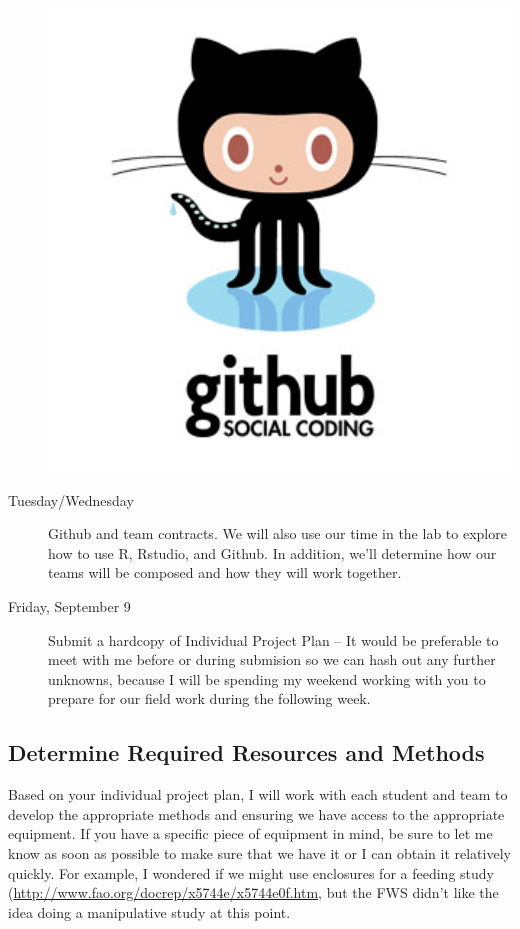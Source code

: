 \documentclass{tufte-handout}\usepackage[]{graphicx}\usepackage[]{color}
\begin{document}
\begin{description}
\begin{marginfigure}
   \includegraphics[width=1.0\textwidth]{github_logo.jpg}
\end{marginfigure}

\item[Tuesday/Wednesday] Github and team contracts. We will also use our time in the lab to explore how to use R, Rstudio, and Github. In addition, we'll determine how our teams will be composed and how they will work together.

\item[Friday, September 9] Submit a hardcopy of Individual Project Plan -- It would be preferable to meet with me before or during submision so we can hash out any further unknowns, because I will be spending my weekend working with you to prepare for our field work during the following week.
\end{description}

\subsection{Determine Required Resources and Methods}

Based on your individual project plan, I will work with each student and team to develop the appropriate methods and ensuring we have access to the appropriate equipment. If you have a specific piece of equipment in mind, be sure to let me know as soon as possible to make sure that we have it or I can obtain it relatively quickly. For example, I wondered if we might use enclosures for a feeding study (\href{http://www.fao.org/docrep/x5744e/x5744e0f.htm}{http://www.fao.org/docrep/x5744e/x5744e0f.htm}, but the FWS didn't like the idea doing a manipulative study at this point.
\end{document}
